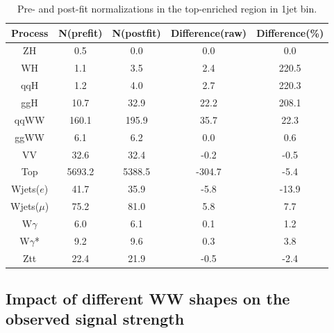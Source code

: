 \begin{table}
\begin{center}
\begin{tabular}{c|cc|cc}
\hline
\hline
Process     &    N(prefit) &   N(postfit) & Difference(raw) &  Difference(\%)  \\  
\hline
\hline
ZH &        0.5 &        0.0 &        0.0 &        0.0        \\
WH &        1.1 &        3.5 &        2.4 &      220.5        \\
qqH &        1.2 &        4.0 &        2.7 &      220.3        \\
ggH &       10.7 &       32.9 &       22.2 &      208.1        \\
\hline
qqWW &      160.1 &      195.9 &       35.7 &       22.3        \\
ggWW &        6.1 &        6.2 &        0.0 &        0.6        \\
\hline
VV &       32.6 &       32.4 &       -0.2 &       -0.5        \\
\hline
Top &     5693.2 &     5388.5 &     -304.7 &       -5.4        \\
\hline
Wjets($e$) &       41.7 &       35.9 &       -5.8 &      -13.9        \\
Wjets($\mu$) &       75.2 &       81.0 &        5.8 &        7.7        \\
\hline
W$\gamma$ &        6.0 &        6.1 &        0.1 &        1.2        \\
W$\gamma$* &        9.2 &        9.6 &        0.3 &        3.8        \\
\hline
Ztt &       22.4 &       21.9 &       -0.5 &       -2.4        \\
\hline
\hline
\end{tabular}
\caption{Pre- and post-fit normalizations in the top-enriched region in 1jet bin.}
\label{tab:fitval_norm_top_1j}
\end{center}
\end{table}


\subsection{Impact of different WW shapes on the observed signal strength} 

